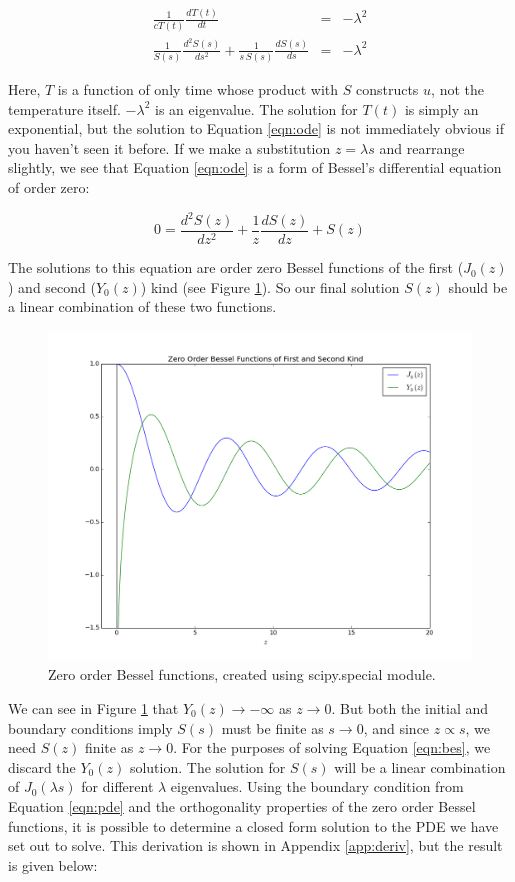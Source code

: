 \documentclass[a4paper,12pt]{article}
\begin{document}
\begin{eqnarray}
\frac{1}{c T(t)}\frac{dT(t)}{dt} &=& -\lambda^2\nonumber\\
\frac{1}{S(s)}\frac{d^2 S(s)}{ds^2} + \frac{1}{s\,S(s)}\frac{dS(s)}{ds} &=& -\lambda^2
\label{eqn:ode} 
\end{eqnarray} 

Here, $T$ is a function of only time whose product with $S$ constructs $u$, not the temperature itself. $-\lambda^2$ is an eigenvalue. The solution for $T(t)$ is simply an exponential, but the solution to Equation \ref{eqn:ode} is not immediately obvious if you haven't seen it before. If we make a substitution $z = \lambda s$ and rearrange slightly, we see that Equation \ref{eqn:ode} is a form of Bessel's differential equation of order zero:

\begin{equation}
0 = \frac{d^2S(z)}{dz^2} + \frac{1}{z}\frac{dS(z)}{dz} + S(z)\nonumber
\end{equation}

The solutions to this equation are order zero Bessel functions of the first ($J_0(z)$) and second ($Y_0(z)$) kind (see Figure \ref{fig:bes}). So our final solution $S(z)$ should be a linear combination of these two functions.

\begin{figure}[H]
\centering
\includegraphics[width = 0.8\linewidth]{bessel.png}
\caption{Zero order Bessel functions, created using scipy.special module.}
\label{fig:bes}
\end{figure}

We can see in Figure \ref{fig:bes} that $Y_0(z) \rightarrow -\infty$ as $z\rightarrow 0$. But both the initial and boundary conditions imply $S(s)$ must be finite as $s\rightarrow 0$, and since $z\propto s$, we need $S(z)$ finite as $z\rightarrow 0$. For the purposes of solving Equation \ref{eqn:bes}, we discard the $Y_0(z)$ solution. The solution for $S(s)$ will be a linear combination of $J_0(\lambda s)$ for different $\lambda$ eigenvalues. Using the boundary condition from Equation \ref{eqn:pde} and the orthogonality properties of the zero order Bessel functions, it is possible to determine a closed form solution to the PDE we have set out to solve. This derivation is shown in Appendix \ref{app:deriv}, but the result is given below:
\end{document}
